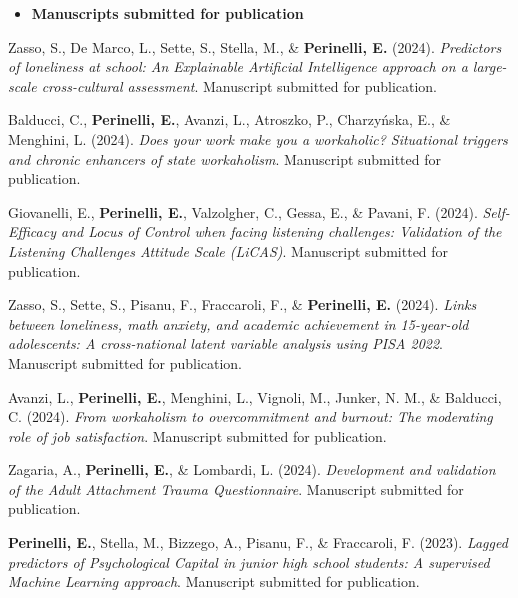 \documentclass[hidelinks, letterpaper,10pt]{article} %
\begin{document}
\begin{itemize}
	\setlength{\topsep}{0pt}%
	\setlength{\leftmargin}{0.1in}%
	\setlength{\listparindent}{-0.1in}%
	\setlength{\itemindent}{-0.2in}%
	\setlength{\parsep}{\parskip}%
	
	\item {\textbf{\large{Manuscripts submitted for publication}}}
\end{itemize}
\begin{etaremune}

	\item Zasso, S., De Marco, L., Sette, S., Stella, M., \& \textbf{Perinelli, E.} (2024). \textit{Predictors of loneliness at school: An Explainable Artificial Intelligence approach on a large-scale cross-cultural assessment}. Manuscript submitted for publication.	
	
	\item Balducci, C., \textbf{Perinelli, E.}, Avanzi, L., Atroszko, P., Charzyńska, E., \& Menghini, L. (2024). \textit{Does your work make you a workaholic? Situational triggers and chronic enhancers of state workaholism}. Manuscript submitted for publication.
	
	\item Giovanelli, E., \textbf{Perinelli, E.}, Valzolgher, C., Gessa, E., \& Pavani, F. (2024). \textit{Self-Efficacy and Locus of Control when facing listening challenges: Validation of the Listening Challenges Attitude Scale (LiCAS)}. Manuscript submitted for publication.
	
	\item Zasso, S., Sette, S., Pisanu, F., Fraccaroli, F., \& \textbf{Perinelli, E.} (2024). \textit{Links between loneliness, math anxiety, and academic achievement in 15-year-old adolescents: A cross-national latent variable analysis using PISA 2022}. Manuscript submitted for publication.
	
	\item Avanzi, L., \textbf{Perinelli, E.}, Menghini, L., Vignoli, M., Junker, N. M., \& Balducci, C. (2024). \textit{From workaholism to overcommitment and burnout: The moderating role of job satisfaction}. Manuscript submitted for publication.

	\item Zagaria, A., \textbf{Perinelli, E.}, \& Lombardi, L. (2024). \textit{Development and validation of the Adult Attachment Trauma Questionnaire}. Manuscript submitted for publication.

	\item \textbf{Perinelli, E.}, Stella, M., Bizzego, A., Pisanu, F., \& Fraccaroli, F. (2023). \textit{Lagged predictors of Psychological Capital in junior high school students: A supervised Machine Learning approach}. Manuscript submitted for publication.
   

\end{etaremune}
\end{document}
